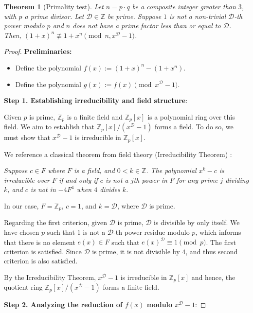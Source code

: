 \documentclass{article}
\theoremstyle{plain}
\theoremstyle{definition}
\newtheorem{theorem}{Theorem}
\newcommand{\D}{\mathcal{D}}
\begin{document}
\begin{theorem}[Primality test] \label{theorem:composites}
\textit{Let $n = p \cdot q$ be a composite integer greater than $3$, with $p$ a prime divisor. Let $\D \in \mathbb{Z}$ be prime. Suppose $1$ is not a non-trivial $\D$-th power modulo $p$ and $n$ does not have a prime factor less than or equal to $\D$. Then, $(1 + x)^n \not\equiv 1 + x^n \pmod{n, x^{\D} - 1}$.}
\end{theorem}
\begin{proof}
\textbf{Preliminaries:}
\begin{itemize}
    \item Define the polynomial $f(x) := (1 + x)^n - (1 + x^n)$.
    \item Define the polynomial $g(x) := f(x) \pmod{x^{\D} - 1}$.
\end{itemize}

\textbf{Step 1. Establishing irreducibility and field structure}:

Given $p$ is prime, $\mathbb{Z}_p$ is a finite field and $\mathbb{Z}_p[x]$ is a polynomial ring over this field. We aim to establish that $\mathbb{Z}_p[x]/(x^{\D}-1)$ forms a field. To do so, we must show that $x^{\D}-1$ is irreducible in $\mathbb{Z}_p[x]$.

We reference a classical theorem from field theory (Irreducibility Theorem) \cite{karpilovsky1989fields}:

\textit{Suppose $c \in F$ where $F$ is a field, and $0 < k \in \mathbb{Z}$. The polynomial $x^k - c$ is irreducible over $F$ if and only if $c$ is not a $j$th power in $F$ for any prime $j$ dividing $k$, and $c$ is not in $-4F^4$ when $4$ divides $k$.}

In our case, $F = \mathbb{Z}_p$, $c = 1$, and $k = \D$, where $\D$ is prime.

Regarding the first criterion, given $\D$ is prime, $\D$ is divisible by only itself. We have chosen $p$ such that $1$ is not a $\D$-th power residue modulo $p$, which informs that there is no element $e(x) \in F$ such that $e(x)^{\D} \equiv 1 \pmod{p}$. The first criterion is satisfied. Since $\D$ is prime, it is not divisible by $4$, and thus second criterion is also satisfied.

By the Irreducibility Theorem, $x^{\D}-1$ is irreducible in $\mathbb{Z}_p[x]$ and hence, the quotient ring $\mathbb{Z}_p[x]/(x^{\D}-1)$ forms a finite field.

\textbf{Step 2. Analyzing the reduction of $f(x)$ modulo $x^\D - 1$}:


\end{proof}
\end{document}
